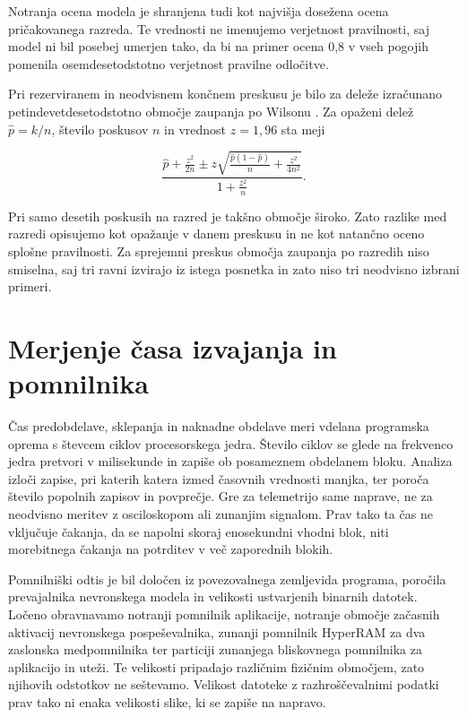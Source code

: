 Notranja ocena modela je shranjena tudi kot najvišja dosežena ocena
pričakovanega razreda. Te vrednosti ne imenujemo verjetnost pravilnosti, saj
model ni bil posebej umerjen tako, da bi na primer ocena 0,8 v vseh pogojih
pomenila osemdesetodstotno verjetnost pravilne odločitve.

Pri rezerviranem in neodvisnem končnem preskusu je bilo za deleže izračunano
petindevetdesetodstotno območje zaupanja po Wilsonu
\cite{wilson1927interval}. Za opaženi delež
$\hat{p}=k/n$, število poskusov $n$ in vrednost $z=1{,}96$ sta meji

\begin{equation}
  \frac{\hat{p}+\frac{z^2}{2n}
  \mathbin{\pm}z\sqrt{\frac{\hat{p}(1-\hat{p})}{n}+\frac{z^2}{4n^2}}}
  {1+\frac{z^2}{n}}.
\end{equation}

Pri samo desetih poskusih na razred je takšno območje široko. Zato razlike med
razredi opisujemo kot opažanje v danem preskusu in ne kot natančno oceno
splošne pravilnosti. Za sprejemni preskus območja zaupanja po razredih niso
smiselna, saj tri ravni izvirajo iz istega posnetka in zato niso tri neodvisno
izbrani primeri.

\section{Merjenje časa izvajanja in pomnilnika}

Čas predobdelave, sklepanja in naknadne obdelave meri vdelana programska oprema
s števcem ciklov procesorskega jedra. Število ciklov se glede na frekvenco jedra
pretvori v milisekunde in zapiše ob posameznem obdelanem bloku. Analiza izloči
zapise, pri katerih katera izmed časovnih vrednosti manjka, ter poroča število
popolnih zapisov in povprečje. Gre za telemetrijo same naprave, ne za neodvisno
meritev z osciloskopom ali zunanjim signalom. Prav tako ta čas ne vključuje
čakanja, da se napolni skoraj enosekundni vhodni blok, niti morebitnega čakanja
na potrditev v več zaporednih blokih.

Pomnilniški odtis je bil določen iz povezovalnega zemljevida programa, poročila
prevajalnika nevronskega modela in velikosti ustvarjenih binarnih datotek.
Ločeno obravnavamo notranji pomnilnik aplikacije, notranje območje začasnih
aktivacij nevronskega pospeševalnika, zunanji pomnilnik HyperRAM za dva
zaslonska medpomnilnika ter particiji zunanjega bliskovnega pomnilnika za
aplikacijo in uteži. Te velikosti pripadajo različnim fizičnim območjem, zato
njihovih odstotkov ne seštevamo. Velikost datoteke z razhroščevalnimi podatki
prav tako ni enaka velikosti slike, ki se zapiše na napravo.

